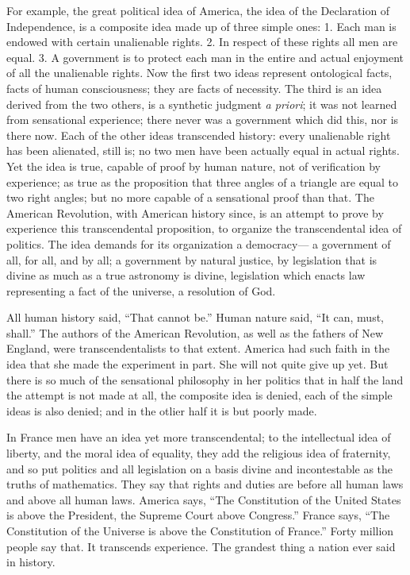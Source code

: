 \documentclass[12pt]{article}
\begin{document}
For example, the great political idea of America, the idea of the Declaration of Independence, is a composite idea made up of three simple ones: 1. Each man is endowed with certain unalienable rights. 2. In respect of these rights all men are equal. 3. A government is to protect each man in the entire and actual enjoyment of all the unalienable rights. Now the first two ideas represent ontological facts, facts of human consciousness; they are facts of necessity. The third is an idea derived from the two others, is a synthetic judgment \emph{a priori}; it was not learned from sensational experience; there never was a government which did this, nor is there now. Each of the other ideas transcended history: every unalienable right has been alienated, still is; no two men have been actually equal in actual rights. Yet the idea is true, capable of proof by human nature, not of verification by experience; as true as the proposition that three angles of a triangle are equal to two right angles; but no more capable of a sensational proof than that. The American Revolution, with American history since, is an attempt to prove by experience this transcendental proposition, to organize the transcendental idea of politics. The idea demands for its organization a democracy--- a government of all, for all, and by all; a government by natural justice, by legislation that is divine as much as a true astronomy is divine, legislation which enacts law representing a fact of the universe, a resolution of God. 

All human history said, ``That cannot be.'' Human nature said, ``It can, must, shall.'' The authors of the American Revolution, as well as the fathers of New England, were transcendentalists to that extent. America had such faith in the idea that she made the experiment in part. She will not quite give up yet. But there is so much of the sensational philosophy in her politics that in half the land the attempt is not made at all, the composite idea is denied, each of the simple ideas is also denied; and in the otlier half it is but poorly made. 

In France men have an idea yet more transcendental; to the intellectual idea of liberty, and the moral idea of equality, they add the religious idea of fraternity, and so put politics and all legislation on a basis divine and incontestable as the truths of mathematics. They say that rights and duties are before all human laws and above all human laws. America says, ``The Constitution of the United States is above the President, the Supreme Court above Congress.'' France says, ``The Constitution of the Universe is above the Constitution of France.'' Forty million people say that. It transcends experience. The grandest thing a nation ever said in history. 
\end{document}
